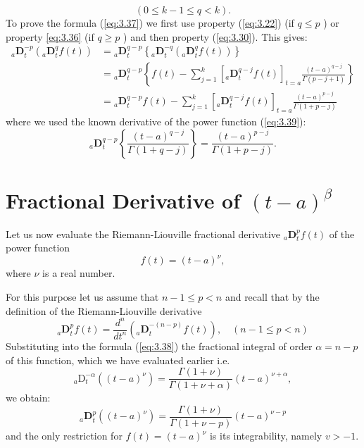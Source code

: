 \documentclass[a4paper,14pt,oneside]{book}
\theoremstyle{plain}
\theoremstyle{definition}
\theoremstyle{remark}
\begin{document}
\begin{center}
\begin{flushleft}
\begin{equation}
\end{equation}
$$
(0 \leq k-1 \leq q<k) .
$$
To prove the formula (\ref{eq:3.37}) we first use property (\ref{eq:3.22}) (if $q \leq p$ ) or property \ref{eq:3.36} (if $q \geq p$ ) and then property (\ref{eq:3.30}). This gives:
$$
\begin{aligned}
{ }_{a} \mathbf{D}_{t}^{-p}\left({ }_{a} \mathbf{D}_{t}^{q} f(t)\right) &={ }_{a} \mathbf{D}_{t}^{q-p}\left\{{ }_{a} \mathbf{D}_{t}^{-q}\left({ }_{a} \mathbf{D}_{t}^{q} f(t)\right)\right\} \\
&={ }_{a} \mathbf{D}_{t}^{q-p}\left\{f(t)-\sum_{j=1}^{k}\left[{ }_{a} \mathbf{D}_{t}^{q-j} f(t)\right]_{t=a} \frac{(t-a)^{q-j}}{\Gamma(p-j+1)}\right\} \\
&={ }_{a} \mathbf{D}_{t}^{q-p} f(t)-\sum_{j=1}^{k}\left[{ }_{a} \mathbf{D}_{t}^{q-j} f(t)\right]_{t=a} \frac{(t-a)^{p-j}}{\Gamma(1+p-j)}
\end{aligned}
$$
where we used the known derivative of the power function (\ref{eq:3.39}):
$$
{ }_{a} \mathbf{D}_{t}^{q-p}\left\{\frac{(t-a)^{q-j}}{\Gamma(1+q-j)}\right\}=\frac{(t-a)^{p-j}}{\Gamma(1+p-j)}.
$$

\section{Fractional Derivative of $(t-a)^{\beta}$}
\Large{
Let us now evaluate the Riemann-Liouville fractional derivative ${ }_{a} \mathbf{D}_{t}^{p} f(t)$ of the power function
$$
f(t)=(t-a)^{\nu},
$$
where $\nu$ is a real number.
\par For this purpose let us assume that $n-1 \leq p<n$ and recall that by the definition of the Riemann-Liouville derivative
\begin{equation}\label{eq:3.38}
{ }_{a} \mathbf{D}_{t}^{p} f(t)=\frac{d^{n}}{d t^{n}}\left({ }_{a} \mathbf{D}_{t}^{-(n-p)} f(t)\right), \quad(n-1 \leq p<n)
\end{equation}
Substituting into the formula (\ref{eq:3.38}) the fractional integral of order $\alpha=n-p$ of this function, which we have evaluated earlier i.e.
$$
{ }_{a} \mathrm{D}_{t}^{-\alpha}\left((t-a)^{\nu}\right)=\frac{\Gamma(1+\nu)}{\Gamma(1+\nu+\alpha)}(t-a)^{\nu+\alpha},
$$
we obtain:
\begin{equation}\label{eq:3.39}
{ }_{a} \mathbf{D}_{t}^{p}\left((t-a)^{\nu}\right)=\frac{\Gamma(1+\nu)}{\Gamma(1+\nu-p)}(t-a)^{\nu-p}
\end{equation}
and the only restriction for $f(t)=(t-a)^{\nu}$ is its integrability, namely $v>-1.$

}
\end{flushleft}
\end{center}
\end{document}

